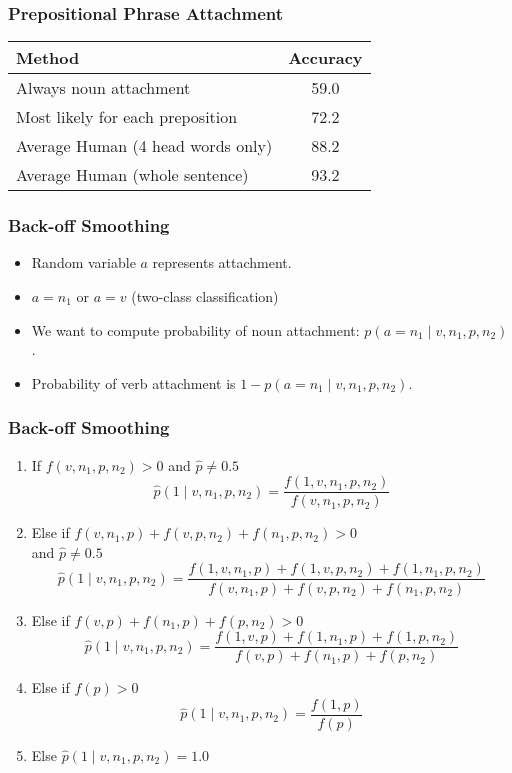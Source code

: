 \begin{frame}
\frametitle{Prepositional Phrase Attachment}
\begin{tabular}{|l|c|}  \hline
Method & Accuracy \\ \hline
Always noun attachment & 59.0 \\
Most likely for each preposition & 72.2 \\
Average Human (4 head words only) & 88.2 \\
Average Human (whole sentence) & 93.2 \\  \hline
\end{tabular}

\end{frame}

\begin{frame}
\frametitle{Back-off Smoothing}
\begin{itemize}[<+->]
\item Random variable $a$ represents attachment. 
\item $a = n_1$ or $a = v$ (two-class classification)
\item We want to compute probability of noun attachment: $p(a = n_1 \mid v, n_1, p, n_2)$. 
\item Probability of verb attachment is $1 - p(a = n_1 \mid v, n_1, p, n_2)$.
\end{itemize}
\end{frame}

\begin{frame}
\frametitle{Back-off Smoothing}
\begin{enumerate}
\item<1-> If $f(v,n_1,p,n_2) > 0$ and $\hat{p} \neq 0.5$
\[ \hat{p}(1 \mid  v,n_1,p,n_2) = \frac{ f(1,v,n_1,p,n_2) }{ f(v,n_1,p,n_2)
} \]
\item<2-> Else if $f(v,n_1,p) + f(v,p,n_2) + f(n_1,p,n_2) > 0$ \\
and $\hat{p} \neq 0.5$
\[ \hat{p}(1 \mid  v,n_1,p,n_2) = \frac{ f(1,v,n_1,p) + f(1,v,p,n_2) +
  f(1,n_1,p,n_2) }{ f(v,n_1,p) + f(v,p,n_2) + f(n_1,p,n_2) } \]
\item<3-> Else if $f(v,p) + f(n_1,p) + f(p,n_2) > 0$
\[ \hat{p}(1 \mid  v,n_1,p,n_2) = \frac{ f(1,v,p) + f(1,n_1,p) +
  f(1,p,n_2) }{ f(v,p) + f(n_1,p) + f(p,n_2) } \]
\item<4-> Else if $f(p) > 0$ 
\[ \hat{p}(1 \mid  v,n_1,p,n_2) = \frac{ f(1,p) }{ f(p) } \]
\item<5-> Else \( \hat{p}(1 \mid  v,n_1,p,n_2) = 1.0 \)
\end{enumerate}
\end{frame}

